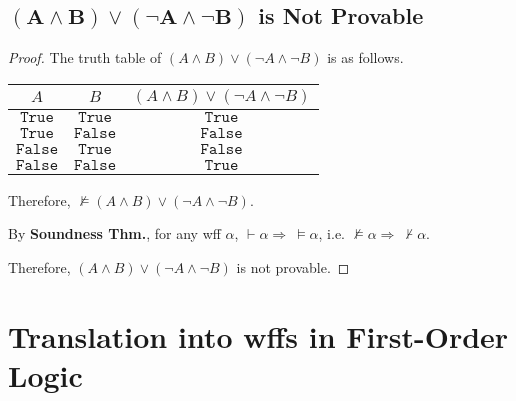 \documentclass{article}
\begin{document}
\vspace{1em}
\subsection{$\boldsymbol{\left(A\land B\right)
\lor\left(\neg A\land\neg B\right)}$ is Not Provable}
\vspace{1em}
\begin{proof}
    The truth table of $\left(A\land B\right)
    \lor\left(\neg A\land\neg B\right)$ is as follows.

    \begin{table}[htbp]
        \centering
        \begin{tabular}{cc|c}
            \hline
            $A$ & $B$ & $\left(A\land B\right)
            \lor\left(\neg A\land\neg B\right)$
            \\
            \hline
            $\mathtt{True}$ & $\mathtt{True}$ & $\mathtt{True}$ \\
            $\mathtt{True}$ & $\mathtt{False}$ & $\mathtt{False}$ \\
            $\mathtt{False}$ & $\mathtt{True}$ & $\mathtt{False}$ \\
            $\mathtt{False}$ & $\mathtt{False}$ & $\mathtt{True}$ \\
            \hline
        \end{tabular}
    \end{table}

    \hspace{1.3em}
    Therefore, $\nvDash \left(A\land B\right)
    \lor\left(\neg A\land\neg B\right)$.

    \hspace{1.3em}
    By \textbf{Soundness Thm.}, for any wff $\alpha$, $\vdash\alpha\Longrightarrow\ \vDash\alpha$,    i.e. $\nvDash\alpha\Longrightarrow\ \nvdash\alpha$.

    \hspace{1.3em}
    Therefore, $\left(A\land B\right)
    \lor\left(\neg A\land\neg B\right)$ is not provable.
\end{proof}

\newpage
\section{Translation into wffs in First-Order Logic}
\vspace{1em}
\end{document}
